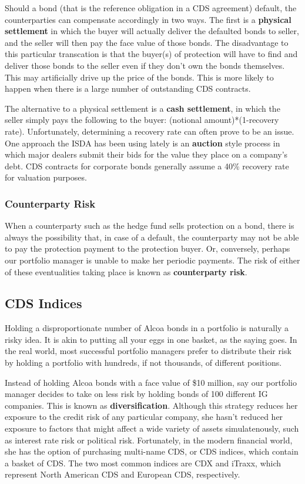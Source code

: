 \documentclass[article]{jss}
\begin{document}
Should a bond (that is the reference obligation in a CDS agreement) default, the counterparties can compensate accordingly in two ways. The first is a \textbf{physical settlement} in which the buyer will actually deliver the defaulted bonds to seller, and the seller will then pay the face value of those bonds. The disadvantage to this particular transcation is that the buyer(s) of protection will have to find and deliver those bonds to the seller even if they don't own the bonds themselves. This may artificially drive up the price of the bonds. This is more likely to happen when there is a large number of outstanding CDS contracts. 

The alternative to a physical settlement is a \textbf{cash settlement}, in which the seller simply pays the following to the buyer: (notional amount)*(1-recovery rate). Unfortunately, determining a recovery rate can often prove to be an issue. One approach the ISDA has been using lately is an \textbf{auction} style process in which major dealers submit their bids for the value they place on a company's debt.  CDS contracts for corporate bonds generally assume a 40\% recovery rate for valuation purposes.

\subsubsection{Counterparty Risk}
\label{sec:CounterpartyRisk}

When a counterparty such as the hedge fund sells protection on a bond, there is always the possibility that, in case of a default, the counterparty may not be able to pay the protection payment to the protection buyer. Or, conversely, perhaps our portfolio manager is unable to make her periodic payments. The risk of either of these eventualities taking place is known as \textbf{counterparty risk}.

\subsection{CDS Indices}
\label{sec:CDSIndices}

Holding a disproportionate number of Alcoa bonds in a portfolio is naturally a risky idea. It is akin to putting all your eggs in one basket, as the saying goes. In the real world, most successful portfolio managers prefer to distribute their risk by holding a portfolio with hundreds, if not thousands, of different positions. 

Instead of holding Alcoa bonds with a face value of \$10 million, say our portfolio manager decides to take on less risk by holding bonds of 100 different IG companies. This is known as \textbf{diversification}. Although this strategy reduces her exposure to the credit risk of any particular company, she hasn't reduced her exposure to factors that might affect a wide variety of assets simulatenously, such as interest rate risk or political risk. Fortunately, in the modern financial world, she has the option of purchasing multi-name CDS, or CDS indices, which contain a basket of CDS. The two most common indices are CDX and iTraxx, which represent North American CDS and European CDS, respectively.
 
\end{document}
